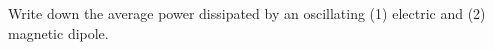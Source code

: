 

\vspace*{\fill}
\centering

Write down the average power dissipated by an oscillating (1) electric and (2) magnetic dipole.

\centering
\vspace*{\fill}

